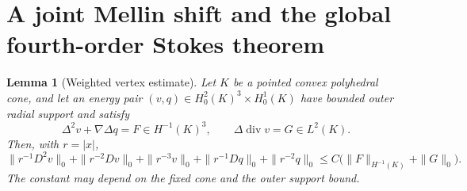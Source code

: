 \documentclass[11pt,a4paper]{article}
\newtheorem{lemma}[theorem]{Lemma}
\theoremstyle{remark}
\numberwithin{equation}{section}
\begin{document}
\section{A joint Mellin shift and the global fourth-order Stokes theorem}
\label{sec:g-global}

\begin{lemma}[Weighted vertex estimate]\label{lem:g-vertexweights}
Let $K$ be a pointed convex polyhedral cone, and let an energy pair
$(v,q)\in H^2_0(K)^3\times H^1_0(K)$ have bounded outer radial support and
satisfy
\[
 \Delta^2v+\nabla\Delta q=F\in H^{-1}(K)^3,\qquad
 \Delta\operatorname{div}v=G\in L^2(K).
\]
Then, with $r=|x|$,
\[
 \|r^{-1}D^2v\|_0+\|r^{-2}Dv\|_0+\|r^{-3}v\|_0
 +\|r^{-1}Dq\|_0+\|r^{-2}q\|_0
 \le C\bigl(\|F\|_{H^{-1}(K)}+\|G\|_0\bigr).
\]
The constant may depend on the fixed cone and the outer support bound.
\end{lemma}
\end{document}
